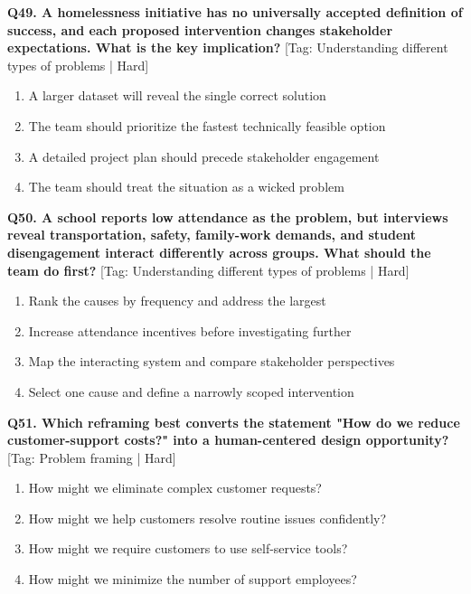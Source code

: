 \noindent\textbf{Q49. A homelessness initiative has no universally accepted definition of success, and each proposed intervention changes stakeholder expectations. What is the key implication?} \hfill [Tag: Understanding different types of problems | Hard]
\begin{enumerate}[label=(\alph*),topsep=2pt,itemsep=1pt,partopsep=0pt,parsep=0pt]
    \item {A larger dataset will reveal the single correct solution}
    \item {The team should prioritize the fastest technically feasible option}
    \item {A detailed project plan should precede stakeholder engagement}
    \item {The team should treat the situation as a wicked problem}
\end{enumerate}
\vspace{2mm}

\noindent\textbf{Q50. A school reports low attendance as the problem, but interviews reveal transportation, safety, family-work demands, and student disengagement interact differently across groups. What should the team do first?} \hfill [Tag: Understanding different types of problems | Hard]
\begin{enumerate}[label=(\alph*),topsep=2pt,itemsep=1pt,partopsep=0pt,parsep=0pt]
    \item {Rank the causes by frequency and address the largest}
    \item {Increase attendance incentives before investigating further}
    \item {Map the interacting system and compare stakeholder perspectives}
    \item {Select one cause and define a narrowly scoped intervention}
\end{enumerate}
\vspace{2mm}

\noindent\textbf{Q51. Which reframing best converts the statement "How do we reduce customer-support costs?" into a human-centered design opportunity?} \hfill [Tag: Problem framing | Hard]
\begin{enumerate}[label=(\alph*),topsep=2pt,itemsep=1pt,partopsep=0pt,parsep=0pt]
    \item {How might we eliminate complex customer requests?}
    \item {How might we help customers resolve routine issues confidently?}
    \item {How might we require customers to use self-service tools?}
    \item {How might we minimize the number of support employees?}
\end{enumerate}
\vspace{2mm}

